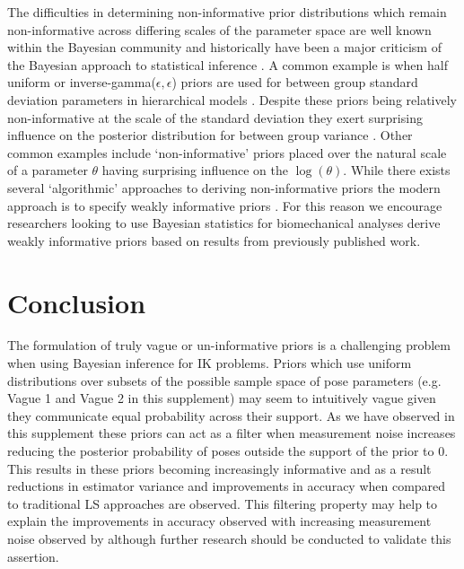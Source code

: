 \documentclass{article}
\begin{document}
The difficulties in determining non-informative prior distributions which remain non-informative across differing scales of the parameter space are well known within the Bayesian community and historically have been a major criticism of the Bayesian approach to statistical inference \citep{gelman_objections_2008, efron_why_1986, gelman_prior_2006}.  A common example is when half uniform  or inverse-gamma($\epsilon, \epsilon$) priors are used for between group standard deviation parameters in hierarchical models \citep{gelman_prior_2006}.  Despite these priors being relatively non-informative at the scale of the standard deviation they exert surprising influence on the posterior distribution for between group variance \citep{gelman_prior_2006}.  Other common examples include `non-informative' priors placed over the natural scale of a parameter $\theta$ having surprising influence on the $\log(\theta)$. While there exists several `algorithmic' approaches to deriving non-informative priors \citep{kass_selection_1996} the modern approach is to specify weakly informative priors \citep{gelman_prior_2006}.  For this reason we encourage researchers looking to use Bayesian statistics for biomechanical analyses derive weakly informative priors based on results from previously published work.

\section{Conclusion}
The formulation of truly vague or un-informative priors is a challenging problem when using Bayesian inference for IK problems.  Priors which use uniform distributions over subsets of the possible sample space of pose parameters (e.g. Vague 1 and Vague 2 in this supplement) may seem to intuitively vague given they communicate equal probability across their support.  As we have observed in this supplement these priors can act as a filter when measurement noise increases reducing the posterior probability of poses outside the support of the prior to 0.  This results in these priors becoming increasingly informative and as a result reductions in estimator variance and improvements in accuracy when compared to traditional LS approaches are observed. This filtering property may help to explain the improvements in accuracy observed with increasing measurement noise observed by \cite{serrien_bayesian_2020} although further research should be conducted to validate this assertion.

\end{document}
